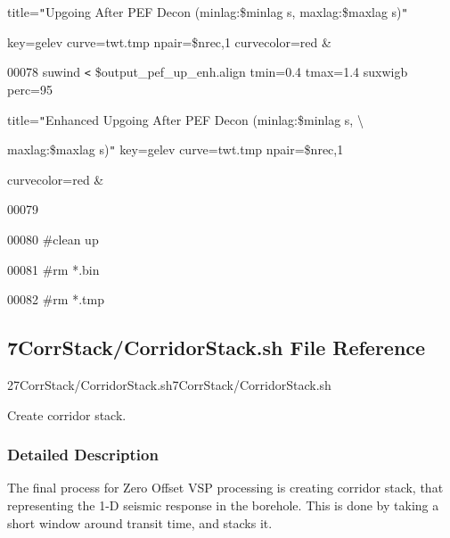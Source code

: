 \documentclass{article}
\begin{document}
\vspace{4pt}
\parindent=18pt
title=\texttt{"}Upgoing After PEF Decon (minlag:\$minlag s, maxlag:\$maxlag s)\texttt{"} 
 

\vspace{4pt}
key=gelev curve=twt.tmp npair=\$nrec,1 curvecolor=red \&

\vspace{4pt}
00078 suwind \texttt{<} \$output\_pef\_up\_enh.align tmin=0.4 tmax=1.4 \textbar{} 
suxwigb perc=95 

\vspace{4pt}
\parindent=36pt
title=\texttt{"}Enhanced Upgoing After PEF Decon (minlag:\$minlag s, \textbackslash{}

\vspace{4pt}
\parindent=0pt
maxlag:\$maxlag  s)\texttt{"}  key=gelev curve=twt.tmp npair=\$nrec,1 

\vspace{4pt}
curvecolor=red \&

\vspace{4pt}
00079 

\vspace{4pt}
00080 \#clean up

\vspace{4pt}
00081 \#rm *.bin

\vspace{4pt}
00082 \#rm *.tmp\newpage

\newpage
\vspace{12pt}
\subsection*{{\large{}\textbf{7CorrStack/CorridorStack.sh File Reference}}}

\vspace{12pt}
27CorrStack/CorridorStack.sh7CorrStack/CorridorStack.sh\label{AAAAAAAAAP}

\vspace{12pt}
Create corridor stack. 

\vspace{24pt}
\subsubsection*{\textbf{Detailed Description}}

\vspace{1pt}
The final process for Zero Offset VSP processing is creating corridor stack, that 
representing the 1-D seismic response in the borehole. This is done by taking a 
short window around transit time, and stacks it. 
\end{document}
